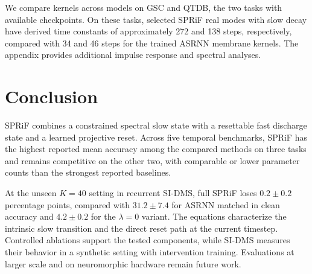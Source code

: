 \documentclass[letterpaper]{article} %
\begin{document}
We compare kernels across models on GSC and QTDB, the two tasks with available checkpoints. On these tasks, selected SPRiF real modes with slow decay have derived time constants of approximately 272 and 138 steps, respectively, compared with 34 and 46 steps for the trained ASRNN membrane kernels. The appendix provides additional impulse response and spectral analyses.


\section{Conclusion}

SPRiF combines a constrained spectral slow state with a resettable fast discharge state and a learned projective reset. Across five temporal benchmarks, SPRiF has the highest reported mean accuracy among the compared methods on three tasks and remains competitive on the other two, with comparable or lower parameter counts than the strongest reported baselines.

At the unseen $K=40$ setting in recurrent SI-DMS, full SPRiF loses $0.2{\pm}0.2$ percentage points, compared with $31.2{\pm}7.4$ for ASRNN matched in clean accuracy and $4.2{\pm}0.2$ for the $\lambda{=}0$ variant. The equations characterize the intrinsic slow transition and the direct reset path at the current timestep. Controlled ablations support the tested components, while SI-DMS measures their behavior in a synthetic setting with intervention training. Evaluations at larger scale and on neuromorphic hardware remain future work.



\end{document}
